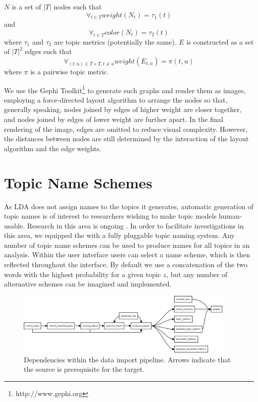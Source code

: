 \documentclass[11pt]{article}
\begin{document}
$N$ is a set of $|T|$ nodes such that
\[\forall_{t\in T} weight(N_{t}) = \tau_{1}(t)\]
and
\[\forall_{t\in T} color(N_{t}) = \tau_{2}(t)\]
where $\tau_1$ and $\tau_2$ are topic metrics (potentially the same). $E$ is
constructed as a set of $|T|^2$ edges such that
  \[\forall_{(t,u)\in T\times T, t\neq u} weight(E_{t,u}) = \pi(t,u)\]
where $\pi$ is a pairwise topic metric.

We use the Gephi Toolkit\footnote{http://www.gephi.org} to generate such graphs
and render them as images, employing a force-directed layout algorithm to
arrange the nodes so that, generally speaking, nodes joined by edges of higher
weight are closer together, and nodes joined by edges of lower weight are
further apart. In the final rendering of the image, edges are omitted to reduce
visual complexity. However, the distances between nodes are still determined by
the interaction of the layout algorithm and the edge weights. 


\section{Topic Name Schemes}
As LDA does not assign names to the topics it generates, automatic generation of
topic names is of interest to researchers wishing to make topic models
human-usable. Research in this area is ongoing \cite{Mei2007,Lau2010}. In order to
facilitate investigations in this area, we equipped the \tool{} with a
fully pluggable topic naming system. Any number of topic name schemes can be
used to produce names for all topics in an analysis. Within the user interface
users can select a name scheme, which is then reflected throughout the
interface. By default we use a concatenation of the two
words with the highest probability for a given topic $z$, but any number of
alternative schemes can be imagined and implemented.%

\begin{figure}[ht]
 \centering
 \includegraphics[width=400px,keepaspectratio=true]{./build_flowchart.png}
 \caption{Dependencies within the data import pipeline. Arrows indicate that the source is prerequisite for the target.}
 \label{fig:build_flowchart}
\end{figure}
\end{document}
